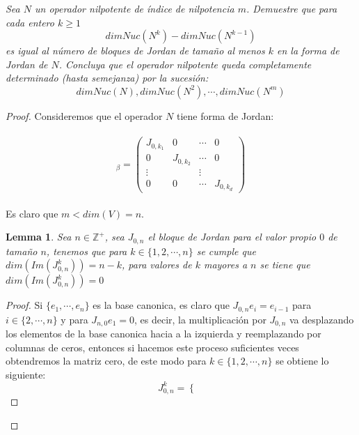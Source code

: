 \documentclass[11pt]{article}
\newtheorem{lemma}[theorem]{Lemma}
\newcommand{\Z}{\mathbb{Z}}
\begin{document}
\begin{tcolorbox}[title = \textcolor{black}{\textcolor{white}{Problema 5}}]
\textit{Sea $N$ un operador nilpotente de \'indice de nilpotencia $m$. Demuestre que para cada entero $k\geq 1$
\begin{equation*}
    dim Nuc(N^k)-dim Nuc(N^{k-1})
\end{equation*}
es igual al n\'umero de bloques de Jordan de tama\~no al menos $k$ en la forma de Jordan de $N$.
Concluya que el operador nilpotente queda completamente determinado (hasta semejanza) por la sucesi\'on:
\begin{equation*}
    dim Nuc(N),dim Nuc(N^2),\cdots,dim Nuc(N^m)
\end{equation*}}
\end{tcolorbox}
\begin{proof}
    Consideremos que el operador $N$ tiene forma de Jordan:\,\\
    \,\\
    \begin{equation*}
        [N]_{\beta}=\begin{pmatrix}
            J_{0,k_1}&0&\cdots&0\\
            0&J_{0,k_2}&\cdots&0\\
            \vdots&&\vdots\\
            0&0&\cdots&J_{0,k_d}
        \end{pmatrix}
    \end{equation*}\,\\
Es claro que $m<dim(V)=n$.
\begin{lemma}
    Sea $n\in \Z^{+}$, sea $J_{0,n}$ el bloque de Jordan para el valor propio $0$ de tamaño $n$, tenemos que para 
    $k\in\{1,2,\cdots,n\}$ se cumple que $dim(Im(J^k_{0,n}))=n-k$, para valores de $k$ mayores a $n$ se tiene que $dim(Im(J^k_{0,n}))=0$
\end{lemma}
\begin{proof}
    Si $\{e_1,\cdots,e_n\}$ es la base canonica, es claro que $J_{0,n}e_i=e_{i-1}$ para $i\in\{2,\cdots,n\}$ y para $J_{n,0}e_1=0$, es decir, la multiplicaci\'on por $J_{0,n}$ va desplazando los elementos de la base canonica hacia a la izquierda y reemplazando por columnas de ceros, entonces si hacemos este proceso 
    suficientes veces obtendremos la matriz cero, de este modo para $k\in\{1,2,\cdots,n\}$ se obtiene lo siguiente:\,\\
    \begin{equation*}
        J_{0,n}^k=\begin{cases}

\end{cases}
\end{equation*}
\end{proof}
\end{proof}
\end{document}

